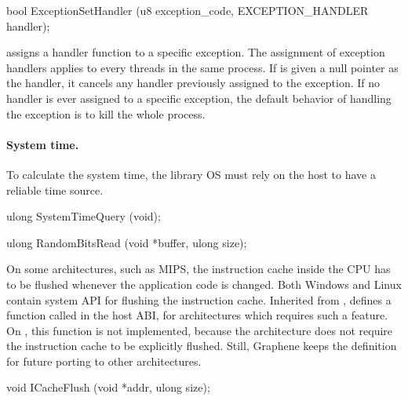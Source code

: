 \begin{paldef}
bool ExceptionSetHandler (u8 exception_code,
                          EXCEPTION_HANDLER handler);
\end{paldef}

 assigns a handler function to a specific exception.
The assignment of exception handlers
applies to every threads in the same process.
If  is given a null pointer as the handler,
it cancels any handler previously assigned to the exception.
If no handler is ever assigned to a specific exception,
the default behavior of handling the exception is to kill the whole process.










\paragraph{System time.} To calculate the system time,
the library OS must rely on the host to have a reliable time source.









\begin{paldef}
ulong SystemTimeQuery (void);
\end{paldef}





\begin{paldef}
ulong RandomBitsRead (void *buffer, ulong size);
\end{paldef}


On some architectures, such as MIPS, the instruction cache inside the CPU 
has to be flushed whenever the application code is changed.
Both Windows and Linux contain system API for flushing the instruction cache.
Inherited from \drawbridge{},
\graphene{} defines a function called  in the host ABI,
for architectures which requires such a feature.
On \graphenearch{}, this function is not implemented,
because the architecture
does not require the instruction cache to be explicitly flushed.
Still, Graphene keeps the definition
for future porting to other architectures.



\begin{paldef}
void ICacheFlush (void *addr, ulong size);
\end{paldef}
